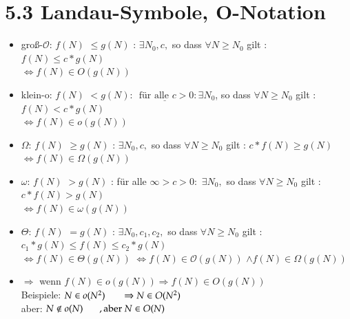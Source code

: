 \documentclass[11pt, fleqn]{scrreprt}
\newcommand{\bigO}[0]{\mathcal{O}}
\begin{document}
\section*{5.3 Landau-Symbole, O-Notation}
\begin{itemize}[label={}]
    \item groß-$\bigO{}$: \hspace*{5mm}$f(N)$ \glqq $\leq$\grqq $g(N)$ : $\exists N_0, c, $ so dass $\forall N \geq N_0$ gilt : $f(N) \leq c * g(N)$\\
    \hspace*{4.5cm}$\Leftrightarrow f(N) \in O(g(N))$

    \item klein-o:  \hspace*{5mm}$f(N)$ \glqq $<$\grqq $g(N) $: $\underline{\text{ für alle } c>0} : \exists N_0 $, so dass $\forall N \geq N_0$ gilt : $f(N) < c * g(N)$\\
    \hspace*{4.5cm}$\Leftrightarrow f(N) \in o(g(N))$

    \item $\Omega$:  \hspace*{5mm}$f(N)$ \glqq $\geq$\grqq $g(N)$ : $\exists N_0, c, $ so dass $\forall N \geq N_0$ gilt : $c *f(N) \geq  g(N)$\\
    \hspace*{4.5cm}$\Leftrightarrow f(N) \in \Omega (g(N))$

    \item $\omega$:  \hspace*{5mm}$f(N)$ \glqq $>$\grqq $g(N)$ : für alle $\infty > c > 0:$ $\exists N_0, $ so dass $\forall N \geq N_0$ gilt : $c* f(N) > g(N)$\\
    \hspace*{4.5cm}$\Leftrightarrow f(N) \in \omega (g(N))$

    \item $\Theta$:  \hspace*{5mm}$f(N)$ \glqq $=$\grqq $g(N)$ : $\exists N_0, c_1, c_2, $ so dass $\forall N \geq N_0$ gilt : $c_1 * g(N) \leq f(N) \leq c_2 * g(N) $\\
    \hspace*{4.5cm}$\Leftrightarrow f(N) \in \Theta (g(N))$ $\Leftrightarrow f(N) \in \bigO{} (g(N))$ $\land f(N) \in \Omega (g(N))$

    \item $\Rightarrow$ wenn  $f(N) \in o(g(N)) \Rightarrow f(N) \in O(g(N))$ \\
    Beispiele: $N \in o(N^2) \hspace*{0.6cm} \Rightarrow N \in O(N^2)$ \\
    \hspace*{0.65cm} aber: $N \not\in o(N) \hspace*{0.6cm} , \text{aber }N \in O(N)$\\
\end{itemize}
\end{document}
